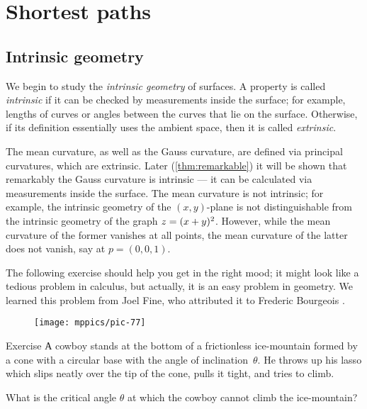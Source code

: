 \chapter{Shortest paths}
\label{chap:shortest}

\section{Intrinsic geometry}

We begin to study the \emph{intrinsic geometry} of surfaces.
A property is called \emph{intrinsic} if it can be checked by measurements inside the surface;
for example, lengths of curves or angles between the curves that lie on the surface.
Otherwise, if its definition essentially uses the ambient space, then it is called \emph{extrinsic}.

The mean curvature, as well as the Gauss curvature, are defined via principal curvatures, which are extrinsic.
Later (\ref{thm:remarkable}) it will be shown that remarkably the Gauss curvature is intrinsic --- it can be calculated via measurements inside the surface.
The mean curvature is not intrinsic; for example, the intrinsic geometry of the $(x,y)$-plane is not distinguishable from the intrinsic geometry of the graph $z\z=(x+y)^2$.
However, while the mean curvature of the former vanishes at all points, the mean curvature of the latter does not vanish, say at $p=(0,0,1)$.  

The following exercise should help you get in the right mood;
it might look like a tedious problem in calculus, but actually, it is an easy problem in geometry.
We learned this problem from Joel Fine, who attributed it to Frederic Bourgeois \cite{fine}.

\begin{wrapfigure}[6]{r}{33 mm}
\vskip-0mm
\centering
\texttt{[image: mppics/pic-77]}
\vskip-0mm
\end{wrapfigure}

\begin{thm}{Exercise}\label{ex:lasso}
А cowboy stands at the bottom of a frictionless ice-mountain formed by a cone with a circular base with the angle of inclination~$\theta$.
He throws up his lasso which slips neatly over the tip of the cone, pulls it tight, and tries to climb.

What is the critical angle $\theta$ at which the cowboy cannot climb the ice-mountain?
\end{thm}

